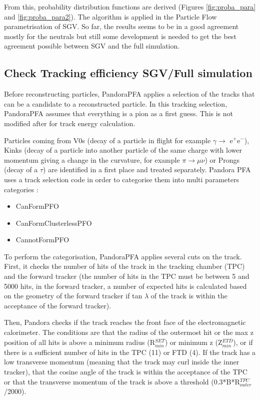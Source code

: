 \noindent
From this, probability distribution functions are derived (Figures \ref{fig:proba_para} and \ref{fig:proba_para2}). The algorithm is applied in the Particle Flow parametrisation of SGV. So far, the results seems to be in a good agreement mostly for the neutrals but still some development is needed to get the best agreement possible between SGV and the full simulation.

\subsection{Check Tracking efficiency SGV/Full simulation}
\label{sec:tracking}

Before reconstructing particles, PandoraPFA applies a selection of the tracks that can be a candidate to a reconstructed particle. In this tracking selection,
PandoraPFA assumes that everything is a pion as a first guess. This is not modified after for track energy calculation.

Particles coming from V0s (decay of a particle in flight for example $\gamma \rightarrow$ e$^+$e$^-$), Kinks (decay of a particle into another particle of the same charge with lower momentum giving a change in the curvature, for example $\pi \rightarrow \mu \nu$) or Prongs (decay of a $\tau$) are identified in a first place and treated separately.
Pandora PFA uses a track selection code in order to categorise them into multi parameters categories :

\begin{itemize}
  \item CanFormPFO
  \item CanFormClusterlessPFO
  \item CannotFormPFO
\end{itemize}

To perform the categorisation, PandoraPFA applies several cuts on the track.
First, it checks the number of hits of the track in the tracking chamber (TPC) and the forward tracker (the number of hits in the TPC must be between 5 and 5000 hits, in the forward tracker, a number of expected hits is calculated based on the geometry of the forward tracker if tan $\lambda$ of the track is within the acceptance of the forward tracker).

Then, Pandora checks if the track reaches the front face of the electromagnetic calorimeter. The conditions are that the radius of the outermost hit or the max z position of all hits is above a minimum radius (R$^{SET}_{min}$) or minimum z (Z$^{ETD}_{min}$), or if there is a sufficient number of hits in the TPC (11) or FTD (4). If the track has a low transverse momentum (meaning that the track may curl inside the inner tracker), that the cosine angle of the track is within the acceptance of the TPC or that the transverse momentum of the track is above a threshold (0.3*B*R$^{TPC}_{outer}$/2000).


